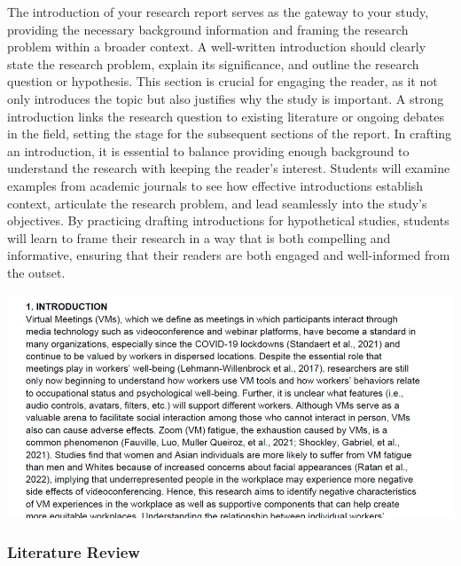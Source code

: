 \documentclass[
]{book}
\begin{document}
The introduction of your research report serves as the gateway to your study, providing the necessary background information and framing the research problem within a broader context. A well-written introduction should clearly state the research problem, explain its significance, and outline the research question or hypothesis. This section is crucial for engaging the reader, as it not only introduces the topic but also justifies why the study is important. A strong introduction links the research question to existing literature or ongoing debates in the field, setting the stage for the subsequent sections of the report. In crafting an introduction, it is essential to balance providing enough background to understand the research with keeping the reader's interest. Students will examine examples from academic journals to see how effective introductions establish context, articulate the research problem, and lead seamlessly into the study's objectives. By practicing drafting introductions for hypothetical studies, students will learn to frame their research in a way that is both compelling and informative, ensuring that their readers are both engaged and well-informed from the outset.

\includegraphics[width=1\textwidth,height=\textheight]{images/fig082.jpg}

\subsubsection*{Literature Review}\label{literature-review}
\end{document}
